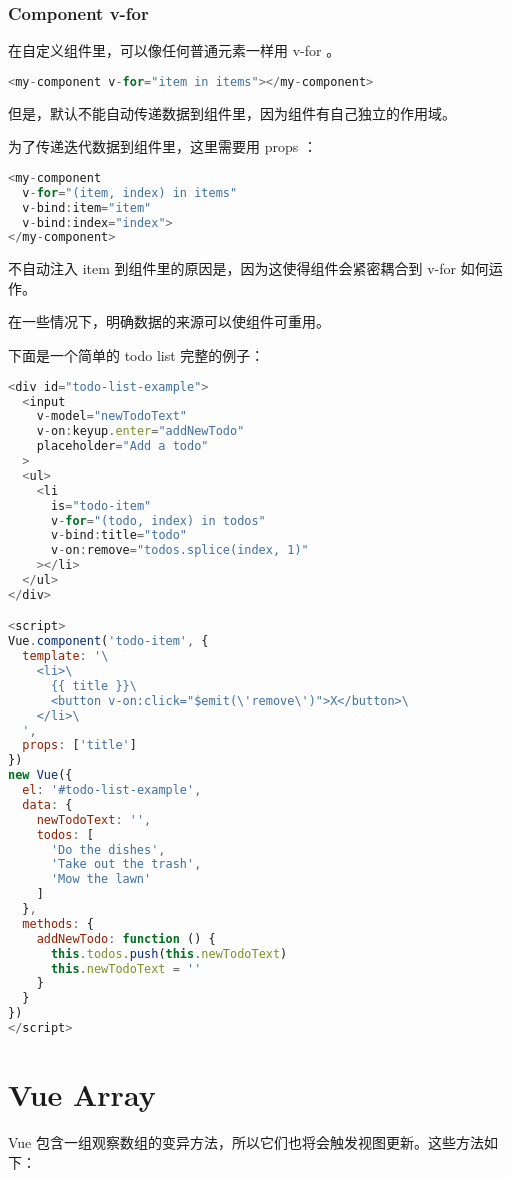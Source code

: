 \subsection{Component v-for}

在自定义组件里，可以像任何普通元素一样用 v-for 。

\begin{lstlisting}[language=JavaScript]
<my-component v-for="item in items"></my-component>
\end{lstlisting}

但是，默认不能自动传递数据到组件里，因为组件有自己独立的作用域。

为了传递迭代数据到组件里，这里需要用 props ：

\begin{lstlisting}[language=JavaScript]
<my-component
  v-for="(item, index) in items"
  v-bind:item="item"
  v-bind:index="index">
</my-component>
\end{lstlisting}


不自动注入 item 到组件里的原因是，因为这使得组件会紧密耦合到 v-for 如何运作。

在一些情况下，明确数据的来源可以使组件可重用。

下面是一个简单的 todo list 完整的例子：


\begin{lstlisting}[language=JavaScript]
<div id="todo-list-example">
  <input
    v-model="newTodoText"
    v-on:keyup.enter="addNewTodo"
    placeholder="Add a todo"
  >
  <ul>
    <li
      is="todo-item"
      v-for="(todo, index) in todos"
      v-bind:title="todo"
      v-on:remove="todos.splice(index, 1)"
    ></li>
  </ul>
</div>

<script>
Vue.component('todo-item', {
  template: '\
    <li>\
      {{ title }}\
      <button v-on:click="$emit(\'remove\')">X</button>\
    </li>\
  ',
  props: ['title']
})
new Vue({
  el: '#todo-list-example',
  data: {
    newTodoText: '',
    todos: [
      'Do the dishes',
      'Take out the trash',
      'Mow the lawn'
    ]
  },
  methods: {
    addNewTodo: function () {
      this.todos.push(this.newTodoText)
      this.newTodoText = ''
    }
  }
})
</script>
\end{lstlisting}

\chapter{Vue Array}

Vue 包含一组观察数组的变异方法，所以它们也将会触发视图更新。这些方法如下：

